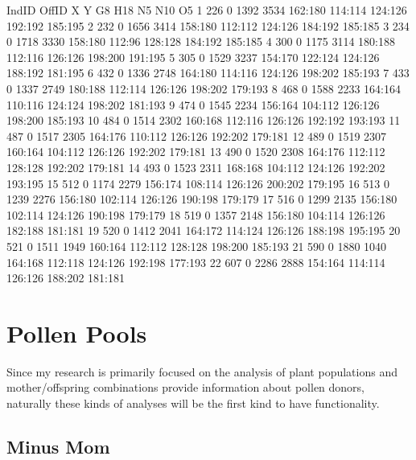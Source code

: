\documentclass[letterpaper,twoside,openany]{book}
\begin{document}
\begin{Schunk}
\begin{Soutput}
   IndID OffID    X    Y      G8     H18      N5     N10      O5
1    226     0 1392 3534 162:180 114:114 124:126 192:192 185:195
2    232     0 1656 3414 158:180 112:112 124:126 184:192 185:185
3    234     0 1718 3330 158:180  112:96 128:128 184:192 185:185
4    300     0 1175 3114 180:188 112:116 126:126 198:200 191:195
5    305     0 1529 3237 154:170 122:124 124:126 188:192 181:195
6    432     0 1336 2748 164:180 114:116 124:126 198:202 185:193
7    433     0 1337 2749 180:188 112:114 126:126 198:202 179:193
8    468     0 1588 2233 164:164 110:116 124:124 198:202 181:193
9    474     0 1545 2234 156:164 104:112 126:126 198:200 185:193
10   484     0 1514 2302 160:168 112:116 126:126 192:192 193:193
11   487     0 1517 2305 164:176 110:112 126:126 192:202 179:181
12   489     0 1519 2307 160:164 104:112 126:126 192:202 179:181
13   490     0 1520 2308 164:176 112:112 128:128 192:202 179:181
14   493     0 1523 2311 168:168 104:112 124:126 192:202 193:195
15   512     0 1174 2279 156:174 108:114 126:126 200:202 179:195
16   513     0 1239 2276 156:180 102:114 126:126 190:198 179:179
17   516     0 1299 2135 156:180 102:114 124:126 190:198 179:179
18   519     0 1357 2148 156:180 104:114 126:126 182:188 181:181
19   520     0 1412 2041 164:172 114:124 126:126 188:198 195:195
20   521     0 1511 1949 160:164 112:112 128:128 198:200 185:193
21   590     0 1880 1040 164:168 112:118 124:126 192:198 177:193
22   607     0 2286 2888 154:164 114:114 126:126 188:202 181:181
\end{Soutput}
\end{Schunk}


\section{Pollen Pools}

Since my research is primarily focused on the analysis of plant populations and mother/offspring combinations provide information about pollen donors, naturally these kinds of analyses will be the first kind to have functionality.

\subsection{Minus Mom}
\end{document}
